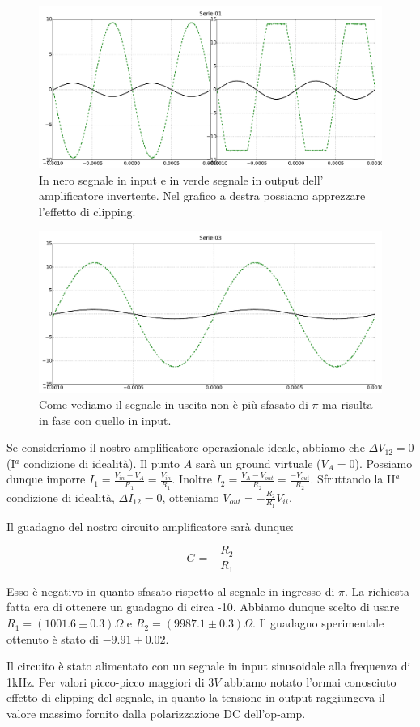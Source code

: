 \begin{figure}
			\includegraphics[width=.45\textwidth]{serie_01_ampl.pdf}
			\caption{In nero segnale in input e in verde segnale in output dell' amplificatore invertente. Nel grafico a destra possiamo apprezzare l'effetto di clipping.}
			\label{fig:inv}
\end{figure}
\begin{figure}
			\includegraphics[width=.45\textwidth]{serie_03_ampl.pdf}
			\caption{Come vediamo il segnale in uscita non è più sfasato di $\pi$ ma risulta in fase con quello in input.}
			\label{fig:inv}
\end{figure}

Se consideriamo il nostro amplificatore operazionale ideale, abbiamo che $\Delta V_{12}=0$ (I$^a$ condizione di idealità).
Il punto $A$ sarà un ground virtuale ($V_A = 0$).
Possiamo dunque imporre $I_1=\frac{V_{in}-V_A}{R_1}=\frac{V_{in}}{R_1}$.
Inoltre $I_2=\frac{V_A-V_{out}}{R_2}=\frac{-V_{out}}{R_2}$.
Sfruttando la II$^a$ condizione di idealità, $\Delta I_{12}=0$, otteniamo $V_{out}=-\frac{R_2}{R_1} V_{ii}$.





Il guadagno del nostro circuito amplificatore sarà dunque:

\begin{equation}
G=-\frac{R_2}{R_1}
\end{equation}




Esso è negativo in quanto sfasato rispetto al segnale in ingresso di $\pi$.
La richiesta fatta era di ottenere un guadagno di circa -10.
Abbiamo dunque scelto di usare $R_1=(1001.6\pm0.3)\Omega$ e $R_2=(9987.1\pm0.3)\Omega$.
Il guadagno sperimentale ottenuto è stato di $-9.91 \pm 0.02$.

Il circuito è stato alimentato con un segnale in input sinusoidale alla frequenza di 1kHz.
Per valori picco-picco maggiori di $3V$ abbiamo notato l'ormai conosciuto effetto di clipping del segnale, in quanto la tensione in output raggiungeva il valore massimo fornito dalla polarizzazione DC dell'op-amp. 




